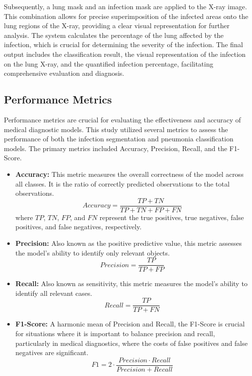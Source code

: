 \documentclass[10pt]{article}
\begin{document}
Subsequently, a lung mask and an infection mask are applied to the X-ray image. This combination allows for precise superimposition of the infected areas onto the lung regions of the X-ray, providing a clear visual representation for further analysis. The system calculates the percentage of the lung affected by the infection, which is crucial for determining the severity of the infection. The final output includes the classification result, the visual representation of the infection on the lung X-ray, and the quantified infection percentage, facilitating comprehensive evaluation and diagnosis.



\subsection{Performance Metrics}

Performance metrics are crucial for evaluating the effectiveness and accuracy of medical diagnostic models. This study utilized several metrics to assess the performance of both the infection segmentation and pneumonia classification models. The primary metrics included Accuracy, Precision, Recall, and the F1-Score.

\begin{itemize}
    \item \textbf{Accuracy:} This metric measures the overall correctness of the model across all classes. It is the ratio of correctly predicted observations to the total observations.
    \begin{equation}
    Accuracy = \frac{TP + TN}{TP + TN + FP + FN}
    \label{eq:accuracy}
    \end{equation}
    where \( TP \), \( TN \), \( FP \), and \( FN \) represent the true positives, true negatives, false positives, and false negatives, respectively.

    \item \textbf{Precision:} Also known as the positive predictive value, this metric assesses the model's ability to identify only relevant objects.
    \begin{equation}
    Precision = \frac{TP}{TP + FP}
    \label{eq:precision}
    \end{equation}

    \item \textbf{Recall:} Also known as sensitivity, this metric measures the model’s ability to identify all relevant cases.
    \begin{equation}
    Recall = \frac{TP}{TP + FN}
    \label{eq:recall}
    \end{equation}

    \item \textbf{F1-Score:} A harmonic mean of Precision and Recall, the F1-Score is crucial for situations where it is important to balance precision and recall, particularly in medical diagnostics, where the costs of false positives and false negatives are significant.
    \begin{equation}
    F1 = 2 \cdot \frac{Precision \cdot Recall}{Precision + Recall}
    \label{eq:f1_score}
    \end{equation}
\end{itemize}
\end{document}
